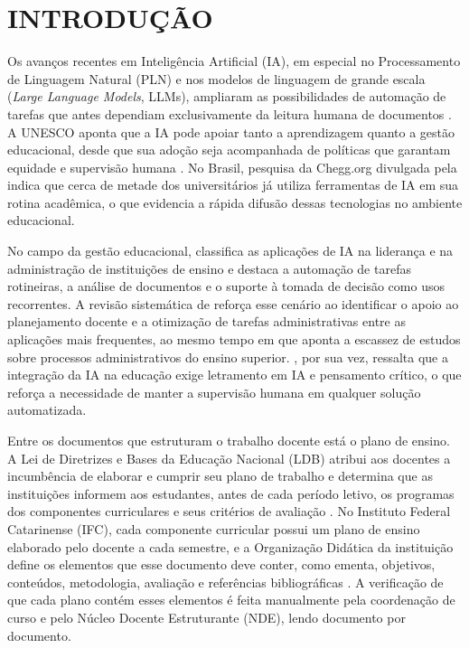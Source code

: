 \chapter{INTRODUÇÃO}
\label{cap:introducao}

Os avanços recentes em Inteligência Artificial (IA), em especial no Processamento de Linguagem Natural (PLN) e nos modelos de linguagem de grande escala (\textit{Large Language Models}, LLMs), ampliaram as possibilidades de automação de tarefas que antes dependiam exclusivamente da leitura humana de documentos \cite{Zhao2023, ADIGUZEL2023}. A UNESCO aponta que a IA pode apoiar tanto a aprendizagem quanto a gestão educacional, desde que sua adoção seja acompanhada de políticas que garantam equidade e supervisão humana \cite{Pedro2019}. No Brasil, pesquisa da Chegg.org divulgada pela  indica que cerca de metade dos universitários já utiliza ferramentas de IA em sua rotina acadêmica, o que evidencia a rápida difusão dessas tecnologias no ambiente educacional.

No campo da gestão educacional,  classifica as aplicações de IA na liderança e na administração de instituições de ensino e destaca a automação de tarefas rotineiras, a análise de documentos e o suporte à tomada de decisão como usos recorrentes. A revisão sistemática de  reforça esse cenário ao identificar o apoio ao planejamento docente e a otimização de tarefas administrativas entre as aplicações mais frequentes, ao mesmo tempo em que aponta a escassez de estudos sobre processos administrativos do ensino superior. , por sua vez, ressalta que a integração da IA na educação exige letramento em IA e pensamento crítico, o que reforça a necessidade de manter a supervisão humana em qualquer solução automatizada.

Entre os documentos que estruturam o trabalho docente está o plano de ensino. A Lei de Diretrizes e Bases da Educação Nacional (LDB) atribui aos docentes a incumbência de elaborar e cumprir seu plano de trabalho e determina que as instituições informem aos estudantes, antes de cada período letivo, os programas dos componentes curriculares e seus critérios de avaliação \cite{Brasil1996}. No Instituto Federal Catarinense (IFC), cada componente curricular possui um plano de ensino elaborado pelo docente a cada semestre, e a Organização Didática da instituição define os elementos que esse documento deve conter, como ementa, objetivos, conteúdos, metodologia, avaliação e referências bibliográficas \cite{ifc2022}. A verificação de que cada plano contém esses elementos é feita manualmente pela coordenação de curso e pelo Núcleo Docente Estruturante (NDE), lendo documento por documento.

